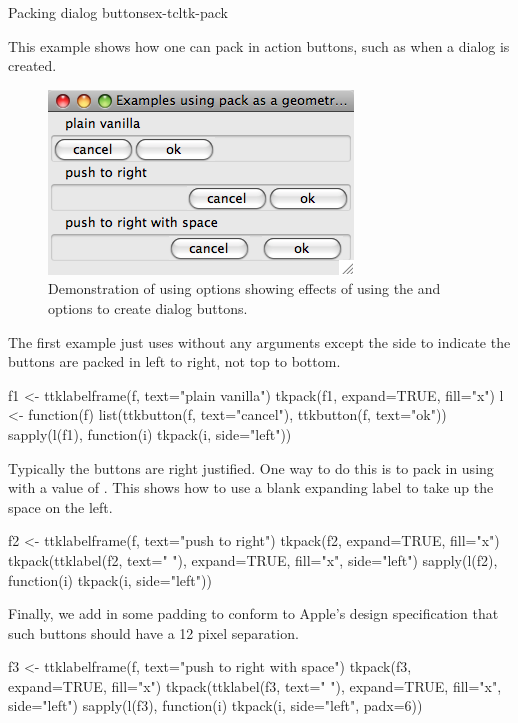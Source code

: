 \begin{example}{Packing dialog buttons}{ex-tcltk-pack}


This example shows how one can pack in action buttons, such as when a
dialog is created.

\begin{figure}
  \centering
  \includegraphics[width=.5\textwidth]{fig-tcltk-pack-buttons.png}
  \caption{Demonstration of using  options showing
    effects of using the 
    and  options to create
    dialog buttons.}
  \label{fig:tcltk-pack-buttons}
\end{figure}


The first example just uses  without any arguments except
the side to indicate the buttons are packed in left to right, not top
to bottom.
\begin{Schunk}
\begin{Sinput}
 f1 <- ttklabelframe(f, text="plain vanilla")
 tkpack(f1, expand=TRUE, fill="x")
 l <- function(f) 
   list(ttkbutton(f, text="cancel"), ttkbutton(f, text="ok"))
 sapply(l(f1), function(i) tkpack(i, side="left"))
\end{Sinput}
\end{Schunk}

Typically the buttons are right justified. One way to do this is to
pack in using  with a value of . This shows
how to use a blank expanding label to take up the space on the left.
\begin{Schunk}
\begin{Sinput}
 f2 <- ttklabelframe(f, text="push to right")
 tkpack(f2, expand=TRUE, fill="x")
 tkpack(ttklabel(f2, text=" "), expand=TRUE, fill="x", 
        side="left")
 sapply(l(f2), function(i) tkpack(i, side="left"))
\end{Sinput}
\end{Schunk}

Finally, we add in some padding to conform to Apple's design specification that such
buttons should have a 12 pixel separation.
\begin{Schunk}
\begin{Sinput}
 f3 <- ttklabelframe(f, text="push to right with space")
 tkpack(f3, expand=TRUE, fill="x")
 tkpack(ttklabel(f3, text=" "), expand=TRUE, fill="x", 
        side="left")
 sapply(l(f3), function(i) tkpack(i, side="left", padx=6))
\end{Sinput}
\end{Schunk}
\end{example}

